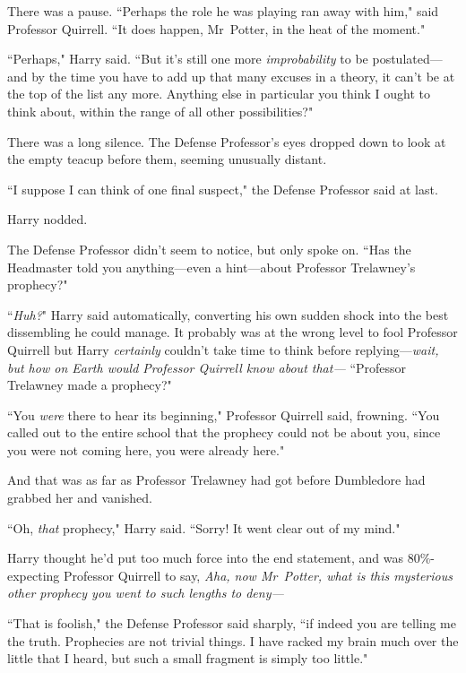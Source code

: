 There was a pause. ``Perhaps the role he was playing ran away with him," said Professor Quirrell. ``It does happen, Mr~Potter, in the heat of the moment."

``Perhaps," Harry said. ``But it's still one more \emph{improbability} to be postulated—and by the time you have to add up that many excuses in a theory, it can't be at the top of the list any more. Anything else in particular you think I ought to think about, within the range of all other possibilities?"

There was a long silence. The Defense Professor's eyes dropped down to look at the empty teacup before them, seeming unusually distant.

``I suppose I can think of one final suspect," the Defense Professor said at last.

Harry nodded.

The Defense Professor didn't seem to notice, but only spoke on. ``Has the Headmaster told you anything—even a hint—about Professor Trelawney's prophecy?"

``\emph{Huh?}" Harry said automatically, converting his own sudden shock into the best dissembling he could manage. It probably was at the wrong level to fool Professor Quirrell but Harry \emph{certainly} couldn't take time to think before replying—\emph{wait, but how on Earth would Professor Quirrell know about \emph{that}—} ``Professor Trelawney made a prophecy?"

``You \emph{were} there to hear its beginning," Professor Quirrell said, frowning. ``You called out to the entire school that the prophecy could not be about you, since you were not coming here, you were already here."


And that was as far as Professor Trelawney had got before Dumbledore had grabbed her and vanished.

``Oh, \emph{that} prophecy," Harry said. ``Sorry! It went clear out of my mind."

Harry thought he'd put too much force into the end statement, and was 80\%-expecting Professor Quirrell to say, \emph{Aha, now Mr~Potter, what is this mysterious \emph{other} prophecy you went to such lengths to deny—}

``That is foolish," the Defense Professor said sharply, ``if indeed you are telling me the truth. Prophecies are not trivial things. I have racked my brain much over the little that I heard, but such a small fragment is simply too little."

